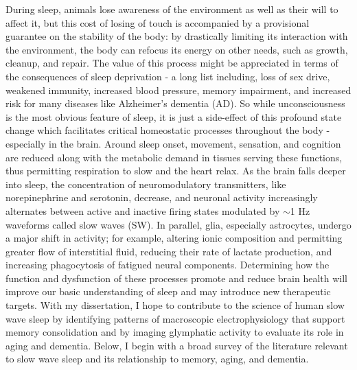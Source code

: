 %
%
During sleep, animals lose awareness of the environment as well as their will to affect it, but this cost of losing of touch is accompanied by a provisional guarantee on the stability of the body: by drastically limiting its interaction with the environment, the body can refocus its energy on other needs, such as growth, cleanup, and repair. The value of this process might be appreciated in terms of the consequences of sleep deprivation - a long list including, loss of sex drive, weakened immunity, increased blood pressure, memory impairment, and increased risk for many diseases like Alzheimer's dementia (AD). So while unconsciousness is the most obvious feature of sleep, it is just a side-effect of this profound state change which facilitates critical homeostatic processes throughout the body - especially in the brain. Around sleep onset, movement, sensation, and cognition are reduced along with the metabolic demand in tissues serving these functions, thus permitting respiration to slow and the heart relax. As the brain falls deeper into sleep, the concentration of neuromodulatory transmitters, like norepinephrine and serotonin, decrease, and neuronal activity increasingly alternates between active and inactive firing states modulated by $\sim$1 Hz waveforms called slow waves (SW). In parallel, glia, especially astrocytes, undergo a major shift in activity; for example, altering ionic composition and permitting greater flow of interstitial fluid, reducing their rate of lactate production, and increasing phagocytosis of fatigued neural components. Determining how the function and dysfunction of these processes promote and reduce brain health will improve our basic understanding of sleep and may introduce new therapeutic targets. With my dissertation, I hope to contribute to the science of human slow wave sleep by identifying patterns of macroscopic electrophysiology that support memory consolidation and by imaging glymphatic activity to evaluate its role in aging and dementia. Below, I begin with a broad survey of the literature relevant to slow wave sleep and its relationship to memory, aging, and dementia.

